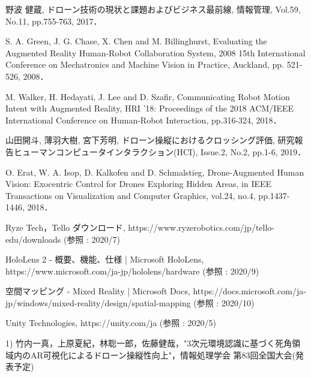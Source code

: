 \documentclass
[a4paper,11pt]{jreport}
\begin{document}
\begin{thebibliography}{99}
\thispagestyle{empty}
野波 健蔵, ドローン技術の現状と課題およびビジネス最前線, 情報管理, Vol.59, No.11, pp.755-763, 2017．

S. A. Green, J. G. Chase, X. Chen and M. Billinghurst, Evaluating the Augmented Reality Human-Robot Collaboration System, 2008 15th International Conference on Mechatronics and Machine Vision in Practice, Auckland, pp. 521-526, 2008．

M. Walker, H. Hedayati, J. Lee and D. Szafir, Communicating Robot Motion Intent with Augmented Reality, HRI '18: Proceedings of the 2018 ACM/IEEE International Conference on Human-Robot Interaction, pp.316-324, 2018．

山田開斗, 薄羽大樹, 宮下芳明, ドローン操縦におけるクロッシング評価, 研究報告ヒューマンコンピュータインタラクション(HCI), Issue.2, No.2, pp.1-6, 2019．

O. Erat, W. A. Isop, D. Kalkofen and D. Schmalstieg, Drone-Augmented Human Vision: Exocentric Control for Drones Exploring Hidden Areas, in IEEE Transactions on Visualization and Computer Graphics, vol.24, no.4, pp.1437-1446, 2018．


Ryze Tech，Tello ダウンロード, https://www.ryzerobotics.com/jp/tello-edu/downloads (参照 : 2020/7)

HoloLens 2 - 概要、機能、仕様 | Microsoft HoloLens, https://www.microsoft.com/ja-jp/hololens/hardware (参照 : 2020/9)

空間マッピング - Mixed Reality | Microsoft Docs, https://docs.microsoft.com/ja-jp/windows/mixed-reality/design/spatial-mapping (参照 : 2020/10)

Unity Technologies, https://unity.com/ja (参照 : 2020/5)

\end{thebibliography}


\renewcommand{\bibname}{研究業績}
\begin{thebibliography}{99}
\thispagestyle{empty}


\item[1) ]竹内一真，上原夏紀，林聡一郎，佐藤健哉，"3次元環境認識に基づく死角領域内のAR可視化によるドローン操縦性向上"，情報処理学会 第83回全国大会(発表予定)

\end{thebibliography}
\end{document}
